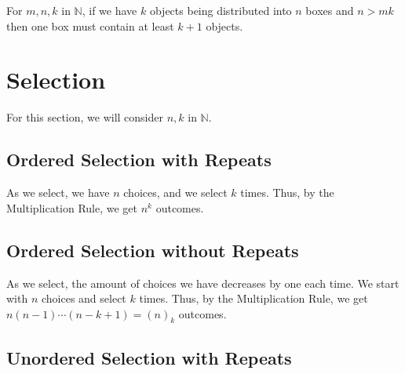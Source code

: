 \documentclass[a4paper, 12pt, twoside]{article}
\begin{document}
For $m, n, k$ in $\mathbb{N}$, if we have $k$ objects being 
distributed into $n$ boxes and $n > mk$ then one box must contain
at least $k + 1$ objects.

\section{Selection}

For this section, we will consider $n, k$ in $\mathbb{N}$.

\subsection{Ordered Selection with Repeats}

As we select, we have $n$ choices, and we select $k$ times. Thus,
by the Multiplication Rule, we get $n^k$ outcomes.

\subsection{Ordered Selection without Repeats}

As we select, the amount of choices we have decreases by one each time.
We start with $n$ choices and select $k$ times. Thus, by the Multiplication
Rule, we get \newline $n(n-1)\cdots(n-k+1) = (n)_k$ outcomes.

\subsection{Unordered Selection with Repeats}
\end{document}
